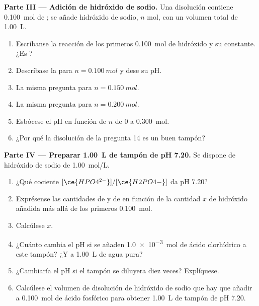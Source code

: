 \begin{problem}
\medskip
\noindent\textbf{Parte III --- Adición de hidróxido de sodio.}
Una disolución contiene \qty{0.100}{mol} de ; se añade
hidróxido de sodio, $n$ mol, con un volumen total de \qty{1.00}{L}.
\begin{enumerate}[resume]
  \item Escríbanse la reacción de los primeros \qty{0.100}{mol} de
        hidróxido y su constante. ¿Es ?
  \item Descríbase la  para $n = \qty{0.100}{mol}$ y
        dese su pH.
  \item La misma pregunta para $n = \qty{0.150}{mol}$.
  \item La misma pregunta para $n = \qty{0.200}{mol}$.
  \item Esbócese el pH en función de $n$ de 0 a \qty{0.300}{mol}.
  \item ¿Por qué la disolución de la pregunta 14 es un buen tampón?
\end{enumerate}

\medskip
\noindent\textbf{Parte IV --- Preparar \qty{1.00}{L} de tampón de pH 7.20.}
Se dispone de hidróxido de sodio de \qty{1.00}{mol/L}.
\begin{enumerate}[resume]
  \item ¿Qué cociente $[\ce{HPO4^{2-}}]/[\ce{H2PO4-}]$ da pH 7.20?
  \item Exprésense las cantidades de  y de  en
        función de la cantidad $x$ de hidróxido añadida más allá de los
        primeros \qty{0.100}{mol}.
  \item Calcúlese $x$.
  \item ¿Cuánto cambia el pH si se añaden \qty{1.0e-3}{mol} de ácido
        clorhídrico a este tampón? ¿Y a \qty{1.00}{L} de agua pura?
  \item ¿Cambiaría el pH si el tampón se diluyera diez veces?
        Explíquese.
  \item Calcúlese el volumen de disolución de hidróxido de sodio que hay
        que añadir a \qty{0.100}{mol} de ácido fosfórico para obtener
        \qty{1.00}{L} de tampón de pH 7.20.
\end{enumerate}
\end{problem}

